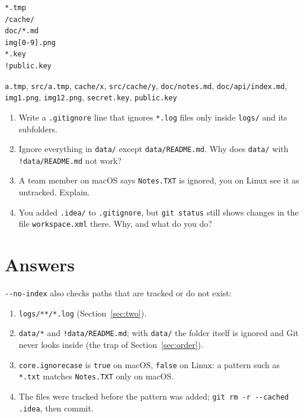 \documentclass[11pt,a4paper]{article}
\begin{document}
\medskip
\noindent
\begin{minipage}[t]{0.3\linewidth}


\begin{lstlisting}[style=codesnippet, language={}, basicstyle=\ttfamily\footnotesize]
*.tmp
/cache/
doc/*.md
img[0-9].png
*.key
!public.key
\end{lstlisting}


\end{minipage}\hfill
\begin{minipage}[t]{0.66\linewidth}
\texttt{a.tmp}, \texttt{src/a.tmp}, \texttt{cache/x}, \texttt{src/cache/y}, \texttt{doc/notes.md}, \texttt{doc/api/index.md},
\texttt{img1.png}, \texttt{img12.png}, \texttt{secret.key}, \texttt{public.key}
\end{minipage}

\begin{enumerate}
  \item Write a \texttt{.gitignore} line that ignores \texttt{*.log} files only inside \texttt{logs/} and its subfolders.
  \item Ignore everything in \texttt{data/} except \texttt{data/README.md}. Why does \texttt{data/} with \texttt{!data/README.md} not work?
  \item A team member on macOS says \texttt{Notes.TXT} is ignored, you on Linux see it as untracked. Explain.
  \item You added \texttt{.idea/} to \texttt{.gitignore}, but \texttt{git status} still shows changes in the file \texttt{workspace.xml} there. Why, and what do you do?
\end{enumerate}



\section{Answers}
\label{sec:answers}


\texttt{-{}-no-index} also checks paths that are tracked or do not exist:


\begin{enumerate}
  \item \texttt{logs/**/*.log} (Section~\ref{sec:two}).
  \item \texttt{data/*} and \texttt{!data/README.md}; with \texttt{data/} the folder itself is ignored and Git never looks inside (the trap of Section~\ref{sec:order}).
  \item \texttt{core.ignorecase} is \texttt{true} on macOS, \texttt{false} on Linux: a pattern such as \texttt{*.txt} matches \texttt{Notes.TXT} only on macOS.
  \item The files were tracked before the pattern was added; \texttt{git rm -r -{}-cached .idea}, then commit.
\end{enumerate}
\end{document}
